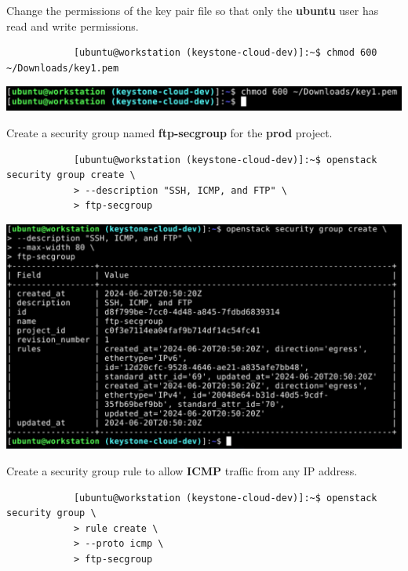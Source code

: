 \documentclass[letterpaper, 12pt]{article}
\begin{document}
\begin{enumerate}
    \begin{labstep}
        Change the permissions of the key pair file so that only the \textbf{ubuntu} user has read and write permissions.
        \begin{lstlisting}
            [ubuntu@workstation (keystone-cloud-dev)]:~$ chmod 600 ~/Downloads/key1.pem
        \end{lstlisting}

        \begin{center}
            \includegraphics[width=\linewidth]{images/part1/step31.png}
        \end{center}
    \end{labstep}

    \begin{labstep}
        Create a security group named \textbf{ftp-secgroup} for the \textbf{prod} project.
        \begin{lstlisting}
            [ubuntu@workstation (keystone-cloud-dev)]:~$ openstack security group create \
            > --description "SSH, ICMP, and FTP" \
            > ftp-secgroup
        \end{lstlisting}

        \begin{center}
            \includegraphics[width=\linewidth]{images/part1/step32.png}
        \end{center}
    \end{labstep}

    \begin{labstep}
        Create a security group rule to allow \textbf{ICMP} traffic from any IP address.
        \begin{lstlisting}
            [ubuntu@workstation (keystone-cloud-dev)]:~$ openstack security group \
            > rule create \
            > --proto icmp \
            > ftp-secgroup
        \end{lstlisting}


\end{labstep}
\end{enumerate}
\end{document}

